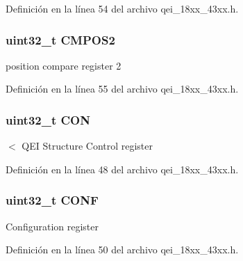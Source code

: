 Definición en la línea 54 del archivo qei\+\_\+18xx\+\_\+43xx.\+h.

\subsubsection[{\texorpdfstring{C\+M\+P\+O\+S2}{CMPOS2}}]{ uint32\+\_\+t C\+M\+P\+O\+S2}\hypertarget{struct_l_p_c___q_e_i___t_a41e0350ea2e9b26c95c50e1d239bd5b8}{}\label{struct_l_p_c___q_e_i___t_a41e0350ea2e9b26c95c50e1d239bd5b8}
position compare register 2 

Definición en la línea 55 del archivo qei\+\_\+18xx\+\_\+43xx.\+h.

\subsubsection[{\texorpdfstring{C\+ON}{CON}}]{ uint32\+\_\+t C\+ON}\hypertarget{struct_l_p_c___q_e_i___t_a67db6fd16b8f287d95ba87dd07b71f0a}{}\label{struct_l_p_c___q_e_i___t_a67db6fd16b8f287d95ba87dd07b71f0a}
$<$ Q\+EI Structure Control register 

Definición en la línea 48 del archivo qei\+\_\+18xx\+\_\+43xx.\+h.

\subsubsection[{\texorpdfstring{C\+O\+NF}{CONF}}]{ uint32\+\_\+t C\+O\+NF}\hypertarget{struct_l_p_c___q_e_i___t_a42f5a13cd52a3f76b0b20e3e7cb441b4}{}\label{struct_l_p_c___q_e_i___t_a42f5a13cd52a3f76b0b20e3e7cb441b4}
Configuration register 

Definición en la línea 50 del archivo qei\+\_\+18xx\+\_\+43xx.\+h.

